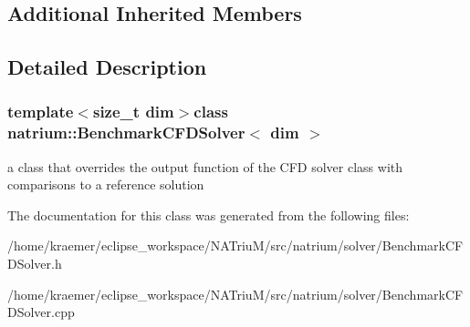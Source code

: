 \subsection*{Additional Inherited Members}


\subsection{Detailed Description}
\subsubsection*{template$<$size\-\_\-t dim$>$class natrium\-::\-Benchmark\-C\-F\-D\-Solver$<$ dim $>$}

a class that overrides the output function of the C\-F\-D solver class with comparisons to a reference solution 

The documentation for this class was generated from the following files\-:\begin{DoxyCompactItemize}
\item 
/home/kraemer/eclipse\-\_\-workspace/\-N\-A\-Triu\-M/src/natrium/solver/Benchmark\-C\-F\-D\-Solver.\-h\item 
/home/kraemer/eclipse\-\_\-workspace/\-N\-A\-Triu\-M/src/natrium/solver/Benchmark\-C\-F\-D\-Solver.\-cpp\end{DoxyCompactItemize}
